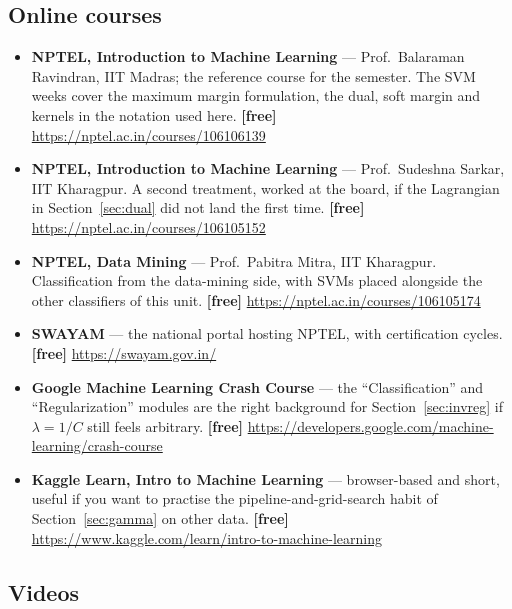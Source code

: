 \documentclass[11pt]{article}
\begin{document}
\subsection*{Online courses}

\begin{sloppypar}
\begin{itemize}[leftmargin=*]
  \item \textbf{NPTEL, Introduction to Machine Learning} --- Prof.\ Balaraman
    Ravindran, IIT Madras; the reference course for the semester. The SVM
    weeks cover the maximum margin formulation, the dual, soft margin and
    kernels in the notation used here. \textbf{[free]}
    \url{https://nptel.ac.in/courses/106106139}
  \item \textbf{NPTEL, Introduction to Machine Learning} --- Prof.\ Sudeshna
    Sarkar, IIT Kharagpur. A second treatment, worked at the board, if the
    Lagrangian in Section~\ref{sec:dual} did not land the first time.
    \textbf{[free]} \url{https://nptel.ac.in/courses/106105152}
  \item \textbf{NPTEL, Data Mining} --- Prof.\ Pabitra Mitra, IIT Kharagpur.
    Classification from the data-mining side, with SVMs placed alongside the
    other classifiers of this unit. \textbf{[free]}
    \url{https://nptel.ac.in/courses/106105174}
  \item \textbf{SWAYAM} --- the national portal hosting NPTEL, with
    certification cycles. \textbf{[free]} \url{https://swayam.gov.in/}
  \item \textbf{Google Machine Learning Crash Course} --- the
    ``Classification'' and ``Regularization'' modules are the right background
    for Section~\ref{sec:invreg} if $\lambda = 1/C$ still feels arbitrary.
    \textbf{[free]}
    \url{https://developers.google.com/machine-learning/crash-course}
  \item \textbf{Kaggle Learn, Intro to Machine Learning} --- browser-based and
    short, useful if you want to practise the pipeline-and-grid-search habit of
    Section~\ref{sec:gamma} on other data. \textbf{[free]}
    \url{https://www.kaggle.com/learn/intro-to-machine-learning}
\end{itemize}
\end{sloppypar}

\subsection*{Videos}
\end{document}
